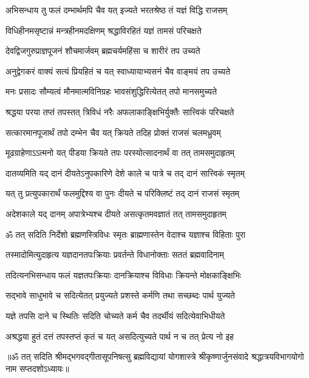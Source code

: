 \twolineshloka
{अभिसन्धाय तु फलं दम्भार्थमपि चैव यत्}
{इज्यते भरतश्रेष्ठ तं यज्ञं विद्धि राजसम्}%

\twolineshloka
{विधिहीनमसृष्टान्नं मन्त्रहीनमदक्षिणम्}
{श्रद्धाविरहितं यज्ञं तामसं परिचक्षते}%

\twolineshloka
{देवद्विजगुरुप्राज्ञपूजनं शौचमार्जवम्}
{ब्रह्मचर्यमहिंसा च शारीरं तप उच्यते}%

\twolineshloka
{अनुद्वेगकरं वाक्यं सत्यं प्रियहितं च यत्}
{स्वाध्यायाभ्यसनं चैव वाङ्मयं तप उच्यते}%

\twolineshloka
{मनः प्रसादः सौम्यत्वं मौनमात्मविनिग्रहः}
{भावसंशुद्धिरित्येतत् तपो मानसमुच्यते}%

\twolineshloka
{श्रद्धया परया तप्तं तपस्तत् त्रिविधं नरैः}
{अफलाकाङ्क्षिभिर्युक्तैः सात्त्विकं परिचक्षते}%

\twolineshloka
{सत्कारमानपूजार्थं तपो दम्भेन चैव यत्}
{क्रियते तदिह प्रोक्तं राजसं चलमध्रुवम्}%

\twolineshloka
{मूढग्राहेणाऽऽत्मनो यत् पीडया क्रियते तपः}
{परस्योत्सादनार्थं वा तत् तामसमुदाहृतम्}%

\twolineshloka
{दातव्यमिति यद् दानं दीयतेऽनुपकारिणे}
{देशे काले च पात्रे च तद् दानं सात्त्विकं स्मृतम्}%

\twolineshloka
{यत् तु प्रत्युपकारार्थं फलमुद्दिश्य वा पुनः}
{दीयते च परिक्लिष्टं तद् दानं राजसं स्मृतम्}%

\twolineshloka
{अदेशकाले यद् दानम् अपात्रेभ्यश्च दीयते}
{असत्कृतमवज्ञातं तत् तामसमुदाहृतम्}%

\twolineshloka
{ॐ तत् सदिति निर्देशो ब्रह्मणस्त्रिविधः स्मृतः}
{ब्राह्मणास्तेन वेदाश्च यज्ञाश्च विहिताः पुरा}%

\twolineshloka
{तस्मादोमित्युदाहृत्य यज्ञदानतपःक्रियाः}
{प्रवर्तन्ते विधानोक्ताः सततं ब्रह्मवादिनाम्}%

\twolineshloka
{तदित्यनभिसन्धाय फलं यज्ञतपःक्रियाः}
{दानक्रियाश्च विविधाः क्रियन्ते मोक्षकाङ्क्षिभिः}%

\twolineshloka
{सद्भावे साधुभावे च सदित्येतत् प्रयुज्यते}
{प्रशस्ते कर्मणि तथा सच्छब्दः पार्थ युज्यते}%

\twolineshloka
{यज्ञे तपसि दाने च स्थितिः सदिति चोच्यते}
{कर्म चैव तदर्थीयं सदित्येवाभिधीयते}%

\twolineshloka
{अश्रद्धया हुतं दत्तं तपस्तप्तं कृतं च यत्}
{असदित्युच्यते पार्थ न च तत् प्रेत्य नो इह}%

{॥ॐ तत् सदिति श्रीमद्भगवद्गीतासूपनिषत्सु ब्रह्मविद्यायां योगशास्त्रे श्रीकृष्णार्जुनसंवादे श्रद्धात्रयविभागयोगो नाम सप्तदशोऽध्यायः॥}

